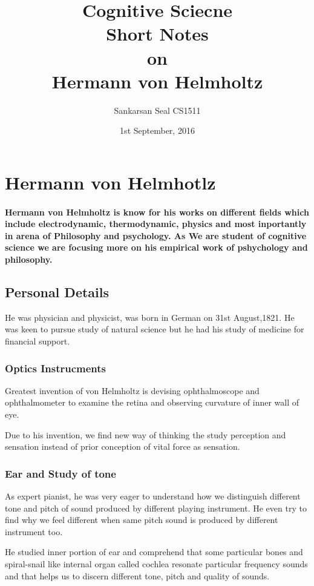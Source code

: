 \documentclass[11pt]{article}
\begin{document}
\title{Cognitive Sciecne\\ Short Notes\\ on\\ Hermann von Helmholtz}
\author{Sankarsan Seal CS1511}
\date{1st September, 2016}
\maketitle

\section{Hermann von Helmhotlz}
\paragraph{Hermann von Helmholtz is know for his works on different fields which include electrodynamic, thermodynamic, physics and most inportantly in arena of Philosophy and psychology. As We are student of cognitive science we are focusing more on his empirical work of pshychology and philosophy.}

\subsection{Personal Details}
He was physician and physicist, was born in German on 31st August,1821. He was keen to pursue study of natural science but he had his study of medicine for financial support.

\subsubsection{Optics Instrucments}
Greatest invention of von Helmholtz is devising ophthalmoscope and ophthalmometer to examine the retina and observing curvature of inner wall of eye.

Due to his invention, we find new way of thinking the study perception and sensation instead of prior conception of vital force as sensation.

\subsubsection{Ear and Study of tone}
As expert pianist, he was very eager to understand how we distinguish different tone and pitch of sound produced by different playing instrument. He even try to find why we feel different when same pitch sound is produced by different instrument too.

He studied inner portion of ear and comprehend that some particular bones and spiral-snail like internal organ called cochlea resonate particular frequency sounds and that helps us to discern different tone, pitch and quality of sounds.

 
\end{document}
